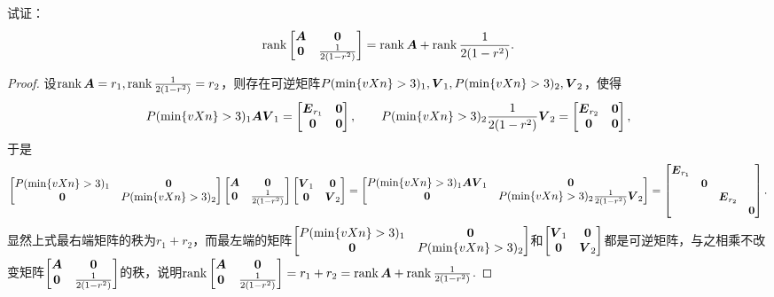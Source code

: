 \begin{example}
试证：\[
\rank\begin{bmatrix} \boldsymbol{A} & \boldsymbol{0} \\ \boldsymbol{0} & \frac{1}{2(1-r^2)} \end{bmatrix} = \rank\boldsymbol{A} + \rank\frac{1}{2(1-r^2)}.
\]
\begin{proof}
设\(\rank\boldsymbol{A} = r_1, \rank\frac{1}{2(1-r^2)} = r_2\)，则存在可逆矩阵\(\P_1,\Q_1,\P_2,\Q_2\)，使得\[
\P_1 \A \Q_1 = \begin{bmatrix}
\E_{r_1} & \z \\
\z & \z
\end{bmatrix},
\qquad
\P_2 \B \Q_2 = \begin{bmatrix}
\E_{r_2} & \z \\
\z & \z
\end{bmatrix},
\]于是\[
\begin{bmatrix}
\P_1 & \z \\
\z & \P_2
\end{bmatrix} \begin{bmatrix}
\A & \z \\
\z & \B
\end{bmatrix} \begin{bmatrix}
\Q_1 & \z \\
\z & \Q_2
\end{bmatrix}
= \begin{bmatrix}
\P_1 \A \Q_1 & \z \\
\z & \P_2 \B \Q_2
\end{bmatrix}
= \begin{bmatrix}
\E_{r_1} \\
& \z \\
& & \E_{r_2} \\
& & & \z
\end{bmatrix}.
\]显然上式最右端矩阵的秩为\(r_1+r_2\)，而最左端的矩阵\(\begin{bmatrix}
P(\min\{v{X}{n}\}>3)_1 & \boldsymbol{0} \\
\boldsymbol{0} & P(\min\{v{X}{n}\}>3)_2
\end{bmatrix}\)和\(\begin{bmatrix}
\Q_1 & \z \\
\z & \Q_2
\end{bmatrix}\)都是可逆矩阵，与之相乘不改变矩阵\(\begin{bmatrix} \boldsymbol{A} & \boldsymbol{0} \\ \boldsymbol{0} & \frac{1}{2(1-r^2)} \end{bmatrix}\)的秩，说明\(\rank\begin{bmatrix} \boldsymbol{A} & \boldsymbol{0} \\ \boldsymbol{0} & \frac{1}{2(1-r^2)} \end{bmatrix} = r_1 + r_2 = \rank\boldsymbol{A} + \rank\frac{1}{2(1-r^2)}\).
\end{proof}
\end{example}

